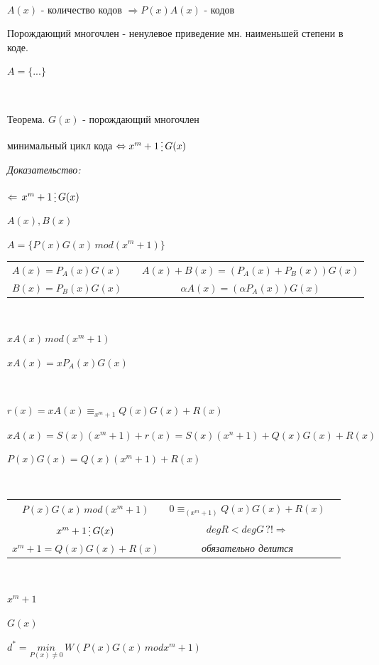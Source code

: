 \documentclass[12pt]{article}
\begin{document}
$ $\par
$A(x)$ - количество кодов $\Rightarrow P(x)A(x)$ - кодов\par
Порождающий многочлен - ненулевое приведение мн. наименьшей степени в коде.\par
$A = \{ ... \}$\par
$ $\par
Теорема. $G(x)$ - порождающий многочлен\par
минимальный цикл кода $\Leftrightarrow x^m + 1 \mathop{\raisebox{-2pt}{\vdots}} G(x)$\par
\textit{Доказательство:}\par
$\Leftarrow \, x^m+1 \mathop{\raisebox{-2pt}{\vdots}} G(x)$\par
$A(x),B(x)$\par
$A=\{ P(x)G(x) \, mod(x^m +1 )\}$\par
\begin{tabular}{ccc}
    $A(x) = P_A(x)G(x)$ &  & $A(x)+B(x) = (P_A(x)+P_B(x))G(x)$   \\
    $B(x) = P_B(x)G(x)$ &  & $\alpha A(x) = (\alpha P_A(x))G(x)$ \\
\end{tabular}\par
$ $\par
$xA(x) \, mod(x^m+1)$\par
$xA(x) = xP_A(x)G(x)$\par
$ $\par
$r(x) = xA(x) \equiv _{x^m+1} Q(x)G(x)+R(x)$\par
$xA(x) = S(x)(x^m+1)+r(x)=S(x)(x^n+1)+Q(x)G(x)+R(x)$\par
$P(x)G(x)=Q(x)(x^m+1)+R(x)$\par
$ $\par
\begin{tabular}{ccc}
    $P(x)G(x) \, mod(x^m+1)$                      & $0 \equiv _{(x^m+1)}Q(x)G(x)+R(x)$ \\
    $x^m+1 \mathop{\raisebox{-2pt}{\vdots}} G(x)$ & $degR < deg G \, ?! \Rightarrow$   \\
    $x^m+1 = Q(x)G(x)+R(x)$                       & \textit{обязательно делится}       \\
\end{tabular}\par
$ $\par
$x^m+1$\par
$G(x)$\par
$d^* = \overset{}{\underset{P(x) \neq 0}{min}} \, W(P(x)G(x) \, mod x^m+1)$\par
\end{document}
